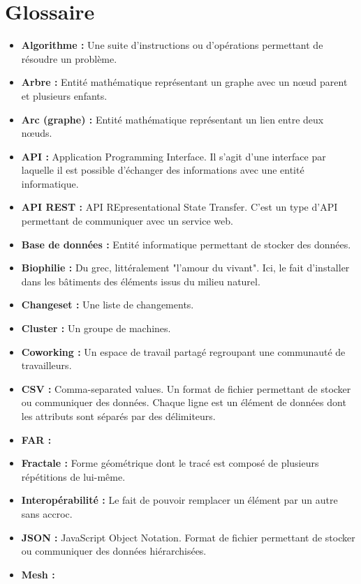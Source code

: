 \chapter*{Glossaire}

\begin{itemize}
    \item \textbf{Algorithme :} Une suite d'instructions ou d'opérations permettant de résoudre un problème.
    \item \textbf{Arbre :} Entité mathématique représentant un graphe avec un nœud parent et plusieurs enfants.
    \item \textbf{Arc (graphe) :} Entité mathématique représentant un lien entre deux nœuds.
    \item \textbf{API :} Application Programming Interface. Il s'agit d'une interface par laquelle
il est possible d'échanger des informations avec une entité informatique.
    \item \textbf{API REST :} API REpresentational State Transfer.
C'est un type d'API permettant de communiquer avec un service web.
    \item \textbf{Base de données :} Entité informatique permettant de stocker des données.
    \item \textbf{Biophilie :} Du grec, littéralement "l'amour du vivant".
Ici, le fait d'installer dans les bâtiments des éléments issus du milieu naturel.
    \item \textbf{Changeset :} Une liste de changements.
    \item \textbf{Cluster :} Un groupe de machines.
    \item \textbf{Coworking :} Un espace de travail partagé regroupant une communauté de travailleurs.
    \item \textbf{CSV :} Comma-separated values. Un format de fichier permettant de stocker ou communiquer des données.
Chaque ligne est un élément de données dont les attributs sont séparés par des délimiteurs.
    \item \textbf{FAR :}
    \item \textbf{Fractale :} Forme géométrique dont le tracé est composé de plusieurs répétitions de lui-même.
    \item \textbf{Interopérabilité :} Le fait de pouvoir remplacer un élément par un autre sans accroc.
    \item \textbf{JSON :} JavaScript Object Notation. Format de fichier permettant de stocker ou communiquer des données hiérarchisées.
    \item \textbf{Mesh :}

\end{itemize}
